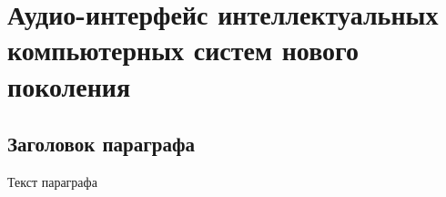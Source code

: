 \chapter{Аудио-интерфейс интеллектуальных компьютерных систем нового поколения}
\label{chapter_audio_interfaces}


\section{Заголовок параграфа}
Текст параграфа

%